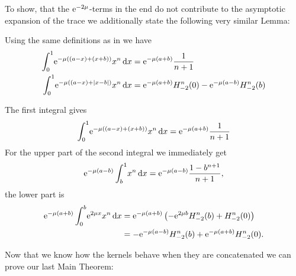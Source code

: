 To show, that the $\Eto{-2\mu}$-terms in the end do not contribute to the
asymptotic expansion of the trace we additionally state the following very
similar Lemma:
\begin{Lemma}
  \label{lem:asymp-2}
  Using the same definitions as in  we have
  \begin{align*}
    \Int{x}{\Eto{-\mu((a-x) + (x+b))}x^n} &= \Eto{-\mu(a+b)}\frac{1}{n+1} \\
\Int{x}{\Eto{-\mu((a-x) + \Abs{x-b})}x^n} &= \Eto{-\mu(a+b)}H^n_{-2}(0) -
    \Eto{-\mu(a-b)}H^n_{-2}(b)
  \end{align*}
  \begin{Proof}
    The first integral gives
    \begin{equation*}
      \Int{x}{\Eto{-\mu((a-x)+(x+b))}x^n} = \Eto{-\mu(a+b)}\frac{1}{n+1}
    \end{equation*}
    For the upper part of the second integral we immediately get
    \begin{equation*}
      \Eto{-\mu(a-b)}\Integ[1]{b}{x}{x^n} =
      \Eto{-\mu(a-b)}\frac{1-b^{n+1}}{n+1},
    \end{equation*}
    the lower part is
    \begin{align*}
      \Eto{-\mu(a+b)}\Integ[b]{0}{x}{\Eto{2\mu x}x^n} &=
      \Eto{-\mu(a+b)}\left(-\Eto{2\mu b}H^n_{-2}(b) + H^n_{-2}(0)\right) \\
      &= -\Eto{-\mu(a-b)}H^n_{-2}(b) + \Eto{-\mu(a+b)}H^n_{-2}(0).
    \end{align*}
  \end{Proof}
\end{Lemma}
Now that we know how the kernels behave when they are concatenated we can prove
our last Main Theorem:
